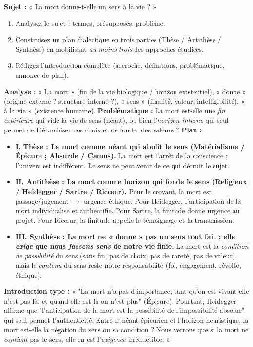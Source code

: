 \documentclass[11pt]{article}
\begin{document}
\begin{exercice}
\textbf{Sujet :} « La mort donne-t-elle un sens à la vie ? »
\begin{enumerate}
    \item Analysez le sujet : termes, présupposés, problème.
    \item Construisez un plan dialectique en trois parties (Thèse / Antithèse / Synthèse) en mobilisant \emph{au moins trois} des approches étudiées.
    \item Rédigez l'introduction complète (accroche, définitions, problématique, annonce de plan).
\end{enumerate}
\end{exercice}

\begin{corrige}
\textbf{Analyse :} « La mort » (fin de la vie biologique / horizon existentiel), « donne » (origine externe ? structure interne ?), « sens » (finalité, valeur, intelligibilité), « à la vie » (existence humaine). \textbf{Problématique :} La mort est-elle une \emph{fin extérieure} qui vide la vie de sens (néant), ou bien l'\emph{horizon interne} qui seul permet de hiérarchiser nos choix et de fonder des valeurs ?
\textbf{Plan :}
\begin{itemize}
    \item \textbf{I. Thèse : La mort comme néant qui abolit le sens (Matérialisme / Épicure ; Absurde / Camus).} La mort est l'arrêt de la conscience ; l'univers est indifférent. Le sens ne peut venir de ce qui détruit le sujet.
    \item \textbf{II. Antithèse : La mort comme horizon qui fonde le sens (Religieux / Heidegger / Sartre / Ricœur).} Pour le croyant, la mort est passage/jugement $\rightarrow$ urgence éthique. Pour Heidegger, l'anticipation de la mort individualise et authentifie. Pour Sartre, la finitude donne urgence au projet. Pour Ricœur, la finitude appelle le témoignage et la transmission.
    \item \textbf{III. Synthèse : La mort ne « donne » pas un sens tout fait ; elle \emph{exige} que nous \emph{fassens sens} de notre vie finie.} La mort est la \emph{condition de possibilité} du sens (sans fin, pas de choix, pas de rareté, pas de valeur), mais le \emph{contenu} du sens reste notre responsabilité (foi, engagement, révolte, éthique).
\end{itemize}
\textbf{Introduction type :} « "La mort n'a pas d'importance, tant qu'on est vivant elle n'est pas là, et quand elle est là on n'est plus" (Épicure). Pourtant, Heidegger affirme que "l'anticipation de la mort est la possibilité de l'impossibilité absolue" qui seul permet l'authenticité. Entre le néant épicurien et l'horizon heuristique, la mort est-elle la négation du sens ou sa condition ? Nous verrons que si la mort ne \emph{contient} pas le sens, elle en est l'\emph{exigence} irréductible. »
\end{corrige}
\end{document}
